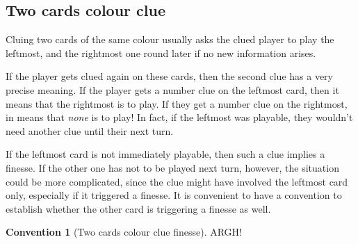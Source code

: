 \documentclass[a4paper]{article}
\theoremstyle{plain}
\theoremstyle{definition}
\newtheorem{convention}[theorem]{Convention}
\begin{document}
\subsection{Two cards colour clue}

Cluing two cards of the same colour usually asks the clued player to play the leftmost, and the rightmost one round later if no new information arises.

If the player gets clued again on these cards, then the second clue has a very precise meaning. If the player gets a number clue on the leftmost card, then it means that the rightmost is to play. If they get a number clue on the rightmost, in means that \textit{none} is to play! In fact, if the leftmost was playable, they wouldn't need another clue until their next turn.

If the leftmost card is not immediately playable, then such a clue implies a finesse. If the other one has not to be played next turn, however, the situation could be more complicated, since the clue might have involved the leftmost card only, especially if it triggered a finesse. It is convenient to have a convention to establish whether the other card is triggering a finesse as well.

\begin{convention}[Two cards colour clue finesse]
	ARGH!
\end{convention}
\end{document}
